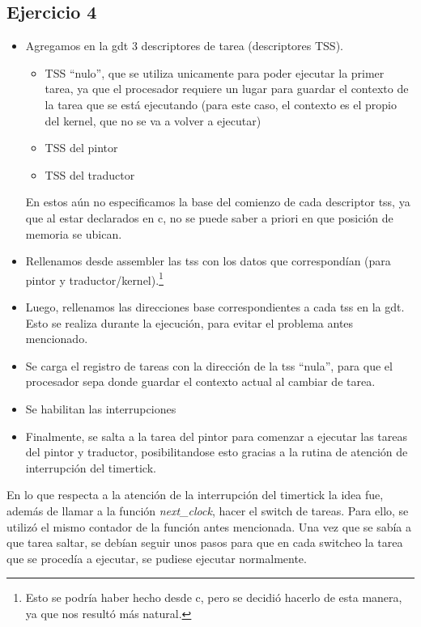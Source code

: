 \subsection{Ejercicio 4}
\begin{itemize}
 \item Agregamos en la gdt 3 descriptores de tarea (descriptores TSS).
	\begin{itemize}
 		\item TSS ``nulo'', que se utiliza unicamente para poder ejecutar la primer tarea, ya que el procesador requiere un lugar para guardar el contexto de la tarea que se est\'a ejecutando (para este caso, el contexto es el propio del kernel, que no se va a volver a ejecutar)
		\item TSS del pintor
		\item TSS del traductor
	\end{itemize}
	En estos a\'un no especificamos la base del comienzo de cada descriptor tss, ya que al estar declarados en c, no se puede saber a priori en que posici\'on de memoria se ubican.

 \item Rellenamos desde assembler las tss con los datos que correspond\'ian (para pintor y traductor/kernel).\footnote{Esto se podr\'ia haber hecho desde c, pero se decidi\'o hacerlo de esta manera, ya que nos result\'o m\'as natural.}
 \item Luego, rellenamos las direcciones base correspondientes a cada tss en la gdt. Esto se realiza durante la ejecuci\'on, para evitar el problema antes mencionado.
 \item Se carga el registro de tareas con la direcci\'on de la tss ``nula'', para que el procesador sepa donde guardar el contexto actual al cambiar de tarea.
 \item Se habilitan las interrupciones
 \item Finalmente, se salta a la tarea del pintor para comenzar a ejecutar las tareas del pintor y traductor, posibilitandose esto gracias a la rutina de atenci\'on de interrupci\'on del timertick.
\end{itemize}

En lo que respecta a la atenci\'on de la interrupci\'on del timertick la idea fue, adem\'as de llamar a la funci\'on \textit{next\_clock}, hacer el switch de tareas. Para ello, se utiliz\'o el mismo contador de la funci\'on antes mencionada. Una vez que se sab\'ia a que tarea saltar, se deb\'ian seguir unos pasos para que en cada switcheo la tarea que se proced\'ia a ejecutar, se pudiese ejecutar normalmente.

